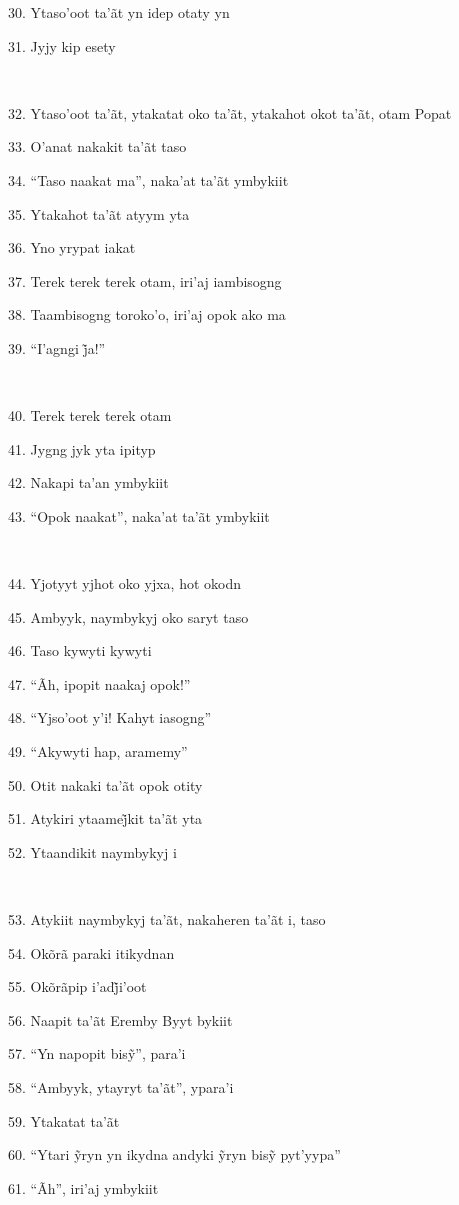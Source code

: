 30. Ytaso'oot ta'ãt yn idep otaty yn

31. Jyjy kip esety

~

32. Ytaso'oot ta'ãt, ytakatat oko ta'ãt, ytakahot okot ta'ãt, otam Popat

33. O'anat nakakit ta'ãt taso

34. ``Taso naakat ma'', naka'at ta'ãt ymbykiit

35. Ytakahot ta'ãt atyym yta

36. Yno yrypat iakat

37. Terek terek terek otam, iri'aj iambisogng

38. Taambisogng toroko'o, iri'aj opok ako ma

39. ``I’agngi j̃a!''

~

40. Terek terek terek otam

41. Jygng jyk yta ipityp

42. Nakapi ta'an ymbykiit

43. ``Opok naakat'', naka'at ta'ãt ymbykiit

~

44. Yjotyyt yjhot oko yjxa, hot okodn

45. Ambyyk, naymbykyj oko saryt taso

46. Taso kywyti kywyti

47. ``Ãh, ipopit naakaj opok!''

48. ``Yjso'oot y'i! Kahyt iasogng''

49. ``Akywyti hap, aramemy''

50. Otit nakaki ta'ãt opok otity

51. Atykiri ytaamej̃kit ta’ãt yta

52. Ytaandikit naymbykyj i

~

53. Atykiit naymbykyj ta'ãt, nakaheren ta'ãt i, taso

54. Okõrã paraki itikydnan

55. Okõrãpip i’adj̃i’oot 

56. Naapit ta'ãt Eremby Byyt bykiit

57. ``Yn napopit bisỹ'', para’i

58. ``Ambyyk, ytayryt ta'ãt'', ypara'i

59. Ytakatat ta'ãt

60. ``Ytari ỹryn yn ikydna andyki ỹryn bisỹ pyt’yypa''

61. ``Ãh'', iri'aj ymbykiit

~

